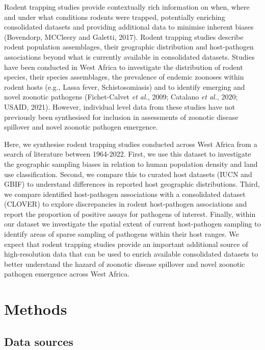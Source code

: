 \documentclass[
]{article}
\begin{document}
Rodent trapping studies provide contextually rich information on when,
where and under what conditions rodents were trapped, potentially
enriching consolidated datasets and providing additional data to
minimise inherent biases (Bovendorp, MCCleery and Galetti, 2017). Rodent
trapping studies describe rodent population assemblages, their
geographic distribution and host-pathogen associations beyond what is
currently available in consolidated datasets. Studies have been
conducted in West Africa to investigate the distribution of rodent
species, their species assemblages, the prevalence of endemic zoonoses
within rodent hosts (e.g., Lassa fever, Schistosomiasis) and to identify
emerging and novel zoonotic pathogens (Fichet-Calvet \emph{et al.},
2009; Catalano \emph{et al.}, 2020; USAID, 2021). However, individual
level data from these studies have not previously been synthesised for
inclusion in assessments of zoonotic disease spillover and novel
zoonotic pathogen emergence.

Here, we synthesise rodent trapping studies conducted across West Africa
from a search of literature between 1964-2022. First, we use this
dataset to investigate the geographic sampling biases in relation to
human population density and land use classification. Second, we compare
this to curated host datasets (IUCN and GBIF) to understand differences
in reported host geographic distributions. Third, we compare identified
host-pathogen associations with a consolidated dataset (CLOVER) to
explore discrepancies in rodent host-pathogen associations and report
the proportion of positive assays for pathogens of interest. Finally,
within our dataset we investigate the spatial extent of current
host-pathogen sampling to identify areas of sparse sampling of pathogens
within their host ranges. We expect that rodent trapping studies provide
an important additional source of high-resolution data that can be used
to enrich available consolidated datasets to better understand the
hazard of zoonotic disease spillover and novel zoonotic pathogen
emergence across West Africa.

\hypertarget{methods}{%
\section{Methods}\label{methods}}

\hypertarget{data-sources}{%
\subsection{Data sources}\label{data-sources}}
\end{document}
